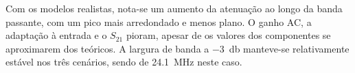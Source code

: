 Com os modelos realistas, nota-se um aumento da atenuação ao longo da banda passante, com um pico mais arredondado e menos plano.
O ganho AC, a adaptação à entrada e o $S_{21}$ pioram, apesar de os valores dos componentes se aproximarem dos teóricos.
A largura de banda a \qty{-3}{\decibel} manteve-se relativamente estável nos três cenários, sendo de \qty{24.1}{\mega\hertz} neste caso.


